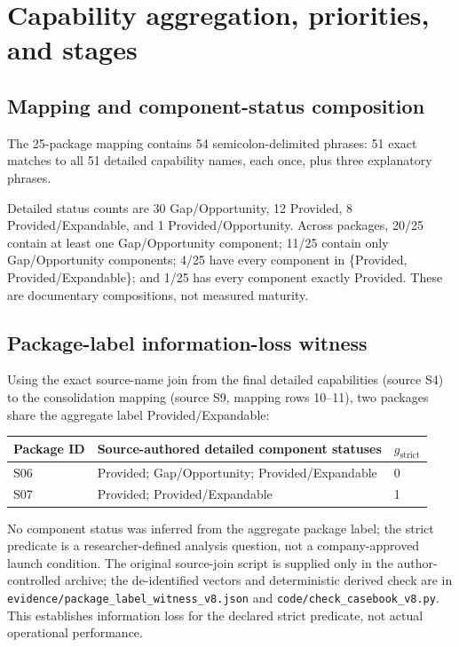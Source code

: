 \section{Capability aggregation, priorities, and stages}\label{app:aggregation}
\setcounter{table}{0}

\subsection{Mapping and component-status composition}\label{app:mapping-status}
The 25-package mapping contains 54 semicolon-delimited phrases: 51 exact matches to all 51 detailed capability names, each once, plus three explanatory phrases.

Detailed status counts are 30 Gap/Opportunity, 12 Provided, 8 Provided/Expandable, and 1 Provided/Opportunity. Across packages, 20/25 contain at least one Gap/Opportunity component; 11/25 contain only Gap/Opportunity components; 4/25 have every component in \{Provided, Provided/Expandable\}; and 1/25 has every component exactly Provided. These are documentary compositions, not measured maturity.


\subsection{Package-label information-loss witness}\label{app:package-witness}
Using the exact source-name join from the final detailed capabilities (source S4) to the consolidation mapping (source S9, mapping rows 10--11), two packages share the aggregate label Provided/Expandable:
\begin{center}
\label{tab:app-witness}
\begin{tabularx}{\linewidth}{p{1.2cm} X p{2.0cm}}
\toprule
Package ID & Source-authored detailed component statuses & $g_{\mathrm{strict}}$ \\
\midrule
S06 & Provided; Gap/Opportunity; Provided/Expandable & 0 \\
S07 & Provided; Provided/Expandable & 1 \\
\bottomrule
\end{tabularx}
\end{center}
No component status was inferred from the aggregate package label; the strict predicate is a researcher-defined analysis question, not a company-approved launch condition. The original source-join script is supplied only in the author-controlled archive; the de-identified vectors and deterministic derived check are in \texttt{evidence/package\_label\_witness\_v8.json} and \texttt{code/check\_casebook\_v8.py}. This establishes information loss for the declared strict predicate, not actual operational performance.


